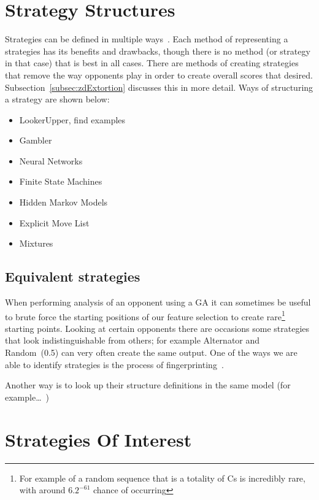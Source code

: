 \section{Strategy Structures}\label{sec:stratergyStructures}
Strategies can be defined in multiple ways~\cite{harper2017reinforcement}.
Each method of representing a strategies has its benefits and drawbacks, though there is no method (or strategy in that case) that is best in all cases.
There are methods of creating strategies that remove the way opponents play in order to create overall scores that desired.
Subsection~\ref{subsec:zdExtortion} discusses this in more detail.
Ways of structuring a strategy are shown below:

\begin{itemize}
 \item LookerUpper, find examples
 \item Gambler
 \item Neural Networks
 \item Finite State Machines
 \item Hidden Markov Models
 \item Explicit Move List
 \item Mixtures
\end{itemize}


\subsection{Equivalent strategies}\label{subsec:equivalentStrategies}
When performing analysis of an opponent using a GA it can sometimes be useful to brute force the starting positions of our feature selection to create rare\footnote{For example of a random sequence that is a totality of Cs is incredibly rare, with around \(6.2^{-61}\) chance of occurring} starting points.
Looking at certain opponents there are occasions some strategies that look indistinguishable from others;
for example Alternator and Random~(0.5) can very often create the same output.
One of the ways we are able to identify strategies is the process of fingerprinting~\cite{Ashlock2004,Ashlock2008}.

Another way is to look up their structure definitions in the same model (for example\ldots~)

\section{Strategies Of Interest}\label{sec:strategiesOfInterest}
